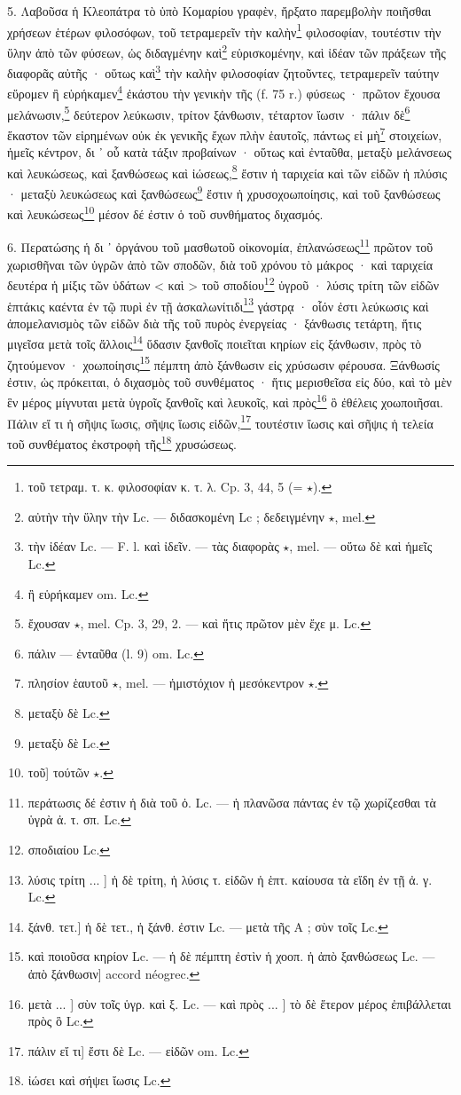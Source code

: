 \documentclass[a4paper, 11pt, oneside, polutonikogreek, french]{article}
\begin{document}
5. Λαβοῦσα ἡ Κλεοπάτρα τὸ ὑπὸ Κομαρίου γραφὲν, ἤρξατο παρεμβολὴν ποιῆσθαι χρήσεων ἑτέρων φιλοσόφων, τοῦ τετραμερεῖν τὴν καλὴν\footnote{τοῦ τετραμ. τ. κ. φιλοσοφίαν κ. τ. λ. Cp. 3, 44, 5 (= $\star$).} φιλοσοφίαν, τουτέστιν τὴν ὕλην ἀπὸ τῶν φύσεων, ὡς διδαγμένην καὶ\footnote{αὐτὴν τὴν ὕλην τὴν Lc. --- διδασκομένη Lc ; δεδειγμένην $\star$, mel.} εὑρισκομένην, καὶ ἰδέαν τῶν πράξεων τῆς διαφορᾶς αὐτῆς · οὕτως καὶ\footnote{τὴν ἰδέαν Lc. --- F. l. καὶ ἰδεῖν. --- τὰς διαφορὰς $\star$, mel. --- οὕτω δὲ καὶ ἡμεῖς Lc.} τὴν καλὴν φιλοσοφίαν ζητοῦντες, τετραμερεῖν ταύτην εὕρομεν ἢ εὑρήκαμεν\footnote{ἢ εὑρήκαμεν om. Lc.} ἐκάστου τὴν γενικὴν τῆς (f. 75 r.) φύσεως · πρῶτον ἔχουσα μελάνωσιν,\footnote{ἔχουσαν $\star$, mel. Cp. 3, 29, 2. --- καὶ ἥτις πρῶτον μὲν ἔχε μ. Lc.} δεύτερον λεύκωσιν, τρίτον ξάνθωσιν, τέταρτον ἴωσιν · πάλιν δὲ\footnote{πάλιν --- ἐνταῦθα (l. 9) om. Lc.} ἕκαστον τῶν εἰρημένων οὐκ ἐκ γενικῆς ἔχων πλὴν ἑαυτοῖς, πάντως εἰ μὴ\footnote{πλησίον ἑαυτοῦ $\star$, mel. --- ἡμιστόχιον ἡ μεσόκεντρον $\star$.} στοιχείων, ἡμεῖς κέντρον, δι ᾽ οὗ κατὰ τάξιν προβαίνων · οὕτως καὶ ἐνταῦθα, μεταξὺ μελάνσεως καὶ λευκώσεως, καὶ ξανθώσεως καὶ ἰώσεως,\footnote{μεταξὺ δὲ Lc.} ἔστιν ἡ ταριχεία καὶ τῶν εἰδῶν ἡ πλύσις · μεταξὺ λευκώσεως καὶ ξανθώσεως\footnote{μεταξὺ δὲ Lc.} ἔστιν ἡ χρυσοχοωποίησις, καὶ τοῦ ξανθώσεως καὶ λευκώσεως\footnote{τοῦ] τούτῶν $\star$.} μέσον δέ ἐστιν ὁ τοῦ συνθήματος διχασμός.

6. Περατώσης ἡ δι ᾽ ὀργάνου τοῦ μασθωτοῦ οἰκονομία, ἐπλανώσεως\footnote{περάτωσις δέ ἐστιν ἡ διὰ τοῦ ὀ. Lc. --- ἡ πλανῶσα πάντας ἐν τῷ χωρίζεσθαι τὰ ὑγρὰ ἀ. τ. σπ. Lc.} πρῶτον τοῦ χωρισθῆναι τῶν ὑγρῶν ἀπὸ τῶν σποδῶν, διὰ τοῦ χρόνου τὸ μάκρος · καὶ ταριχεία δευτέρα ἡ μίξις τῶν ὐδάτων < καὶ > τοῦ σποδίου\footnote{σποδιαίου Lc.} ὑγροῦ · λύσις τρίτη τῶν εἰδῶν ἑπτάκις καέντα ἐν τῷ πυρὶ ἐν τῇ ἀσκαλωνίτιδι\footnote{λύσις τρίτη ... ] ἡ δὲ τρίτη, ἡ λύσις τ. εἰδῶν ἡ ἑπτ. καίουσα τὰ εἴδη ἐν τῇ ἀ. γ. Lc.} γάστρᾳ · οἷόν ἐστι λεύκωσις καὶ ἀπομελανισμὸς τῶν εἰδῶν διὰ τῆς τοῦ πυρὸς ἐνεργείας · ξάνθωσις τετάρτη, ἥτις μιγεῖσα μετὰ τοῖς ἄλλοις\footnote{ξάνθ. τετ.] ἡ δὲ τετ., ἡ ξάνθ. ἐστιν Lc. --- μετὰ τῆς A ; σὺν τοῖς Lc.} ὕδασιν ξανθοῖς ποιεῖται κηρίων εἰς ξάνθωσιν, πρὸς τὸ ζητούμενον · χοωποίησις\footnote{καὶ ποιοῦσα κηρίον Lc. --- ἡ δὲ πέμπτη ἐστὶν ἡ χοοπ. ἡ ἀπὸ ξανθώσεως Lc. --- ἀπὸ ξάνθωσιν] accord néogrec.} πέμπτη ἀπὸ ξάνθωσιν εἰς χρύσωσιν φέρουσα. Ξάνθωσίς ἐστιν, ὡς πρόκειται, ὁ διχασμὸς τοῦ συνθέματος · ἥτις μερισθεῖσα εἰς δύο, καὶ τὸ μὲν ἓν μέρος μίγνυται μετὰ ὑγροῖς ξανθοῖς καὶ λευκοῖς, καὶ πρὸς\footnote{μετὰ ... ] σὺν τοῖς ὑγρ. καὶ ξ. Lc. --- καὶ πρὸς ... ] τὸ δὲ ἕτερον μέρος ἐπιβάλλεται πρὸς ὃ Lc.} ὃ ἐθέλεις χοωποιῆσαι. Πάλιν εἴ τι ἡ σῆψις ἴωσις, σῆψις ἴωσις εἰδῶν,\footnote{πάλιν εἴ τι] ἔστι δὲ Lc. --- εἰδῶν om. Lc.} τουτέστιν ἴωσις καὶ σῆψις ἡ τελεία τοῦ συνθέματος ἐκστροφὴ τῆς\footnote{ἰώσει καὶ σήψει ἴωσις Lc.} χρυσώσεως.
\end{document}
